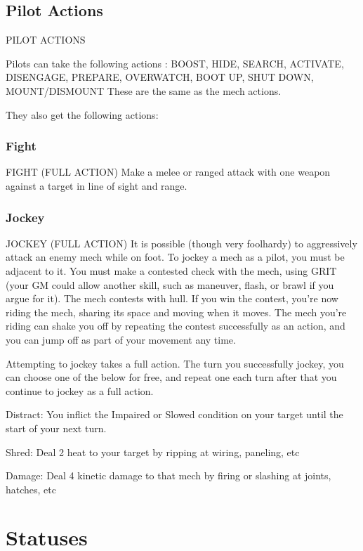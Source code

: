 \section{Pilot Actions}
   PILOT ACTIONS  

Pilots can take the following actions : BOOST, HIDE, SEARCH, ACTIVATE, DISENGAGE,   
PREPARE, OVERWATCH, BOOT UP, SHUT DOWN, MOUNT/DISMOUNT  
These are the same as the mech actions.
 

They also get the following actions:
 
\subsection{Fight}
                                      FIGHT (FULL ACTION)  
Make a melee or ranged attack with one weapon against a target in line of sight and range.
 
\subsection{Jockey}

                                    JOCKEY (FULL ACTION)  
It is possible (though very foolhardy) to aggressively attack an enemy mech while on foot. To  
jockey a mech as a pilot, you must be adjacent to it. You must make a contested check with the  
mech, using GRIT (your GM could allow another skill, such as maneuver, flash, or brawl if you  
argue for it). The mech contests with hull. If you win the contest, you’re now riding the mech,  
sharing its space and moving when it moves. The mech you’re riding can shake you off by  
repeating the contest successfully as an action, and you can jump off as part of your movement  
any time. 
 

Attempting to jockey takes a full action. The turn you successfully jockey, you can choose one of  
the below for free, and repeat one each turn after that you continue to jockey as a full action.
 

Distract: You inflict the Impaired or Slowed condition on your target until the start of your next  
turn.
 
Shred: Deal 2 heat to your target by ripping at wiring, paneling, etc
 
Damage: Deal 4 kinetic damage to that mech by firing or slashing at joints, hatches, etc
 
\chapter{Statuses}

